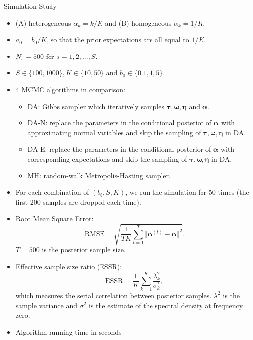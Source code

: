 \documentclass[10pt]{beamer}
\theoremstyle{remark}
\theoremstyle{definition}
\newcommand{\bcol}[1]{{\color{blue}{#1}}}
\begin{document}
\begin{frame}{Simulation Study}
\begin{itemize}
	\item (A) heterogeneous $\alpha_k = k/K$ and (B) homogeneous $\alpha_k = 1/K$.
	\item $a_0 = b_0/K$, so that the prior expectations are all equal to $1/K$.
	\item $N_s=500$ for $s=1,2, ..., S$.
	\item $S\in \{100, 1000\}, K\in \{10, 50\}$ and $b_0\in \{0.1, 1, 5\}$.
	\item 4 MCMC algorithms in comparison:
	\begin{itemize}
		\item DA: Gibbs sampler which iteratively samples $\bm{\tau, \omega, \eta}$ and $\bm\alpha$.
		\item DA-N: replace the parameters in the conditional posterior of $\bm\alpha$ with approximating normal variables and skip the sampling of $\bm{\tau, \omega, \eta}$ in DA.
		\item DA-E: replace the parameters in the conditional posterior of $\bm\alpha$ with corresponding expectations and skip the sampling of $\bm{\tau, \omega, \eta}$ in DA.
		\item MH: random-walk Metropolis-Hasting sampler.
	\end{itemize}
   \item For each combination of $(b_0, S, K)$, we run the simulation for 50 times (the first 200 samples are dropped each time).
\end{itemize}
\end{frame}

\begin{frame}
\bcol{Metrics:}
\begin{itemize}
	\item Root Mean Square Error: $$\text{RMSE} = \sqrt{\frac{1}{TK}\sum_{t=1}^{T} \Vert \bm{\alpha}^{(t)} - \bm{\alpha} \Vert^2 }.$$ $T=500$ is the posterior sample size. 
	\item Effective sample size ratio (ESSR): $$\text{ESSR} = \frac{1}{K}\sum_{k=1}^K\frac{\lambda_k^2}{\sigma_k^2},$$ which measures the serial correlation between posterior samples. $\lambda^2$ is the sample variance and $\sigma^2$ is the estimate of the spectral density at frequency zero. 
	\item Algorithm running time in seconds
\end{itemize}
\end{frame}
\end{document}
